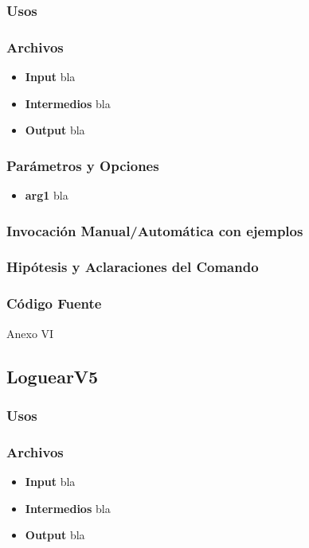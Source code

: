 \documentclass[a4paper,10pt,titlepage]{article}
\begin{document}
		\subsubsection{Usos}


		\subsubsection{Archivos}
			\begin {itemize}
				\item \textbf{Input} {bla}
				\item \textbf{Intermedios} {bla}
				\item \textbf{Output} {bla}
			\end{itemize}

		\subsubsection{Par\'ametros y Opciones}
			\begin {itemize}
				\item \textbf{arg1} {bla}
			\end{itemize}
	
		\subsubsection{Invocaci\'on Manual/Autom\'atica con ejemplos}

		\subsubsection{Hip\'otesis y Aclaraciones del Comando}

		\subsubsection{C\'odigo Fuente}
			Anexo VI

	\subsection{LoguearV5}
		\subsubsection{Usos}


		\subsubsection{Archivos}
			\begin {itemize}
				\item \textbf{Input} {bla}
				\item \textbf{Intermedios} {bla}
				\item \textbf{Output} {bla}
			\end{itemize}
\end{document}
